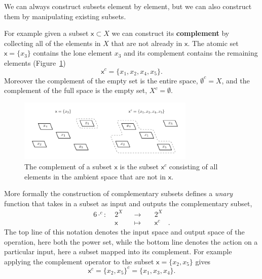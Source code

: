 \documentclass[
  letterpaper,
  DIV=11,
  numbers=noendperiod]{scrartcl}
\begin{document}
We can always construct subsets element by element, but we can also
construct them by manipulating existing subsets.

For example given a subset \(\mathsf{x} \subset X\) we can construct its
\textbf{complement} by collecting all of the elements in \(X\) that are
not already in \(\mathsf{x}\). The atomic set
\(\mathsf{x} = \{ x_{3} \}\) contains the lone element \(x_3\) and its
complement contains the remaining elements (Figure~\ref{fig-complement})
\[
\mathsf{x}^{c} = \{ x_{1}, x_{2}, x_{4}, x_{5} \}.
\] Moreover the complement of the empty set is the entire space,
\(\emptyset^{c} = X\), and the complement of the full space is the empty
set, \(X^{c} = \emptyset\).

\begin{figure}

{\centering \includegraphics[width=0.75\textwidth,height=\textheight]{figures/complement/complement.pdf}

}

\caption{\label{fig-complement}The complement of a subset \(\mathsf{x}\)
is the subset \(\mathsf{x}^{c}\) consisting of all elements in the
ambient space that are not in \(\mathsf{x}\).}

\end{figure}

More formally the construction of complementary subsets defines a
\emph{unary} function that takes in a subset as input and outputs the
complementary subset, \begin{alignat*}{6}
\cdot^c :\; & 2^X & &\rightarrow& \; & 2^X &
\\
& \mathsf{x} & &\mapsto& & \mathsf{x}^{c} &.
\end{alignat*} The top line of this notation denotes the input space and
output space of the operation, here both the power set, while the bottom
line denotes the action on a particular input, here a subset mapped into
its complement. For example applying the complement operator to the
subset \(\mathsf{x} = \{ x_{2}, x_{5} \}\) gives \[
\mathsf{x}^{c} = \{ x_{2}, x_{5} \}^{c} = \{ x_{1}, x_{3}, x_{4} \}.
\]
\end{document}
